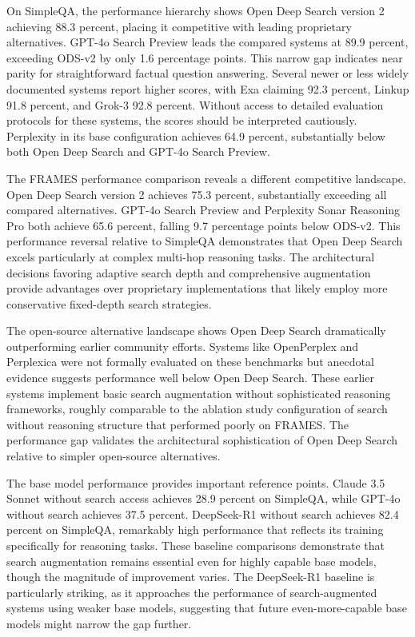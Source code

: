 On SimpleQA, the performance hierarchy shows Open Deep Search version 2 achieving 88.3 percent, placing it competitive with leading proprietary alternatives. GPT-4o Search Preview leads the compared systems at 89.9 percent, exceeding ODS-v2 by only 1.6 percentage points. This narrow gap indicates near parity for straightforward factual question answering. Several newer or less widely documented systems report higher scores, with Exa claiming 92.3 percent, Linkup 91.8 percent, and Grok-3 92.8 percent. Without access to detailed evaluation protocols for these systems, the scores should be interpreted cautiously. Perplexity in its base configuration achieves 64.9 percent, substantially below both Open Deep Search and GPT-4o Search Preview.

The FRAMES performance comparison reveals a different competitive landscape. Open Deep Search version 2 achieves 75.3 percent, substantially exceeding all compared alternatives. GPT-4o Search Preview and Perplexity Sonar Reasoning Pro both achieve 65.6 percent, falling 9.7 percentage points below ODS-v2. This performance reversal relative to SimpleQA demonstrates that Open Deep Search excels particularly at complex multi-hop reasoning tasks. The architectural decisions favoring adaptive search depth and comprehensive augmentation provide advantages over proprietary implementations that likely employ more conservative fixed-depth search strategies.

The open-source alternative landscape shows Open Deep Search dramatically outperforming earlier community efforts. Systems like OpenPerplex and Perplexica were not formally evaluated on these benchmarks but anecdotal evidence suggests performance well below Open Deep Search. These earlier systems implement basic search augmentation without sophisticated reasoning frameworks, roughly comparable to the ablation study configuration of search without reasoning structure that performed poorly on FRAMES. The performance gap validates the architectural sophistication of Open Deep Search relative to simpler open-source alternatives.

The base model performance provides important reference points. Claude 3.5 Sonnet without search access achieves 28.9 percent on SimpleQA, while GPT-4o without search achieves 37.5 percent. DeepSeek-R1 without search achieves 82.4 percent on SimpleQA, remarkably high performance that reflects its training specifically for reasoning tasks. These baseline comparisons demonstrate that search augmentation remains essential even for highly capable base models, though the magnitude of improvement varies. The DeepSeek-R1 baseline is particularly striking, as it approaches the performance of search-augmented systems using weaker base models, suggesting that future even-more-capable base models might narrow the gap further.

